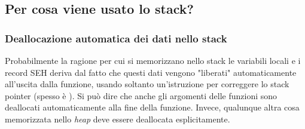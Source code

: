 \subsection{Per cosa viene usato lo stack?}








\subsubsection{Deallocazione automatica dei dati nello stack}

Probabilmente la ragione per cui si memorizzano nello stack le variabili locali e i record SEH deriva dal fatto che questi dati vengono "liberati" automaticamente all'uscita dalla funzione,
usando soltanto un'istruzione per correggere lo stack pointer (spesso è \ADD).
Si può dire che anche gli argomenti delle funzioni sono deallocati automaticamente alla fine della funzione.
Invece, qualunque altra cosa memorizzata nello \emph{heap} deve essere deallocata esplicitamente.





